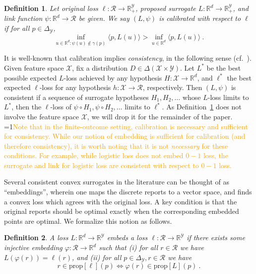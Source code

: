 \documentclass[12pt]{article}
\newcommand{\Comments}{1}
\newcommand{\mynote}[2]{\ifnum\Comments=1\textcolor{#1}{#2}\fi}
\newcommand{\proposedadd}[1]{\mynote{orange}{#1}}
\newcommand{\reals}{\mathbb{R}}
\newcommand{\prop}[1]{\mathrm{prop}[#1]}
\newcommand{\simplex}{\Delta_\Y}
\newcommand{\R}{\mathcal{R}}
\newcommand{\X}{\mathcal{X}}
\newcommand{\Y}{\mathcal{Y}}
\newcommand{\inprod}[2]{\langle #1, #2 \rangle}%
\DeclareMathOperator*{\argmin}{arg\,min}
\newtheorem{definition}{Definition}
\begin{document}
\begin{definition}
  \label{def:calibrated}
  Let original loss $\ell:\R\to\reals^\Y_+$, proposed surrogate $L:\reals^d\to\reals^\Y_+$, and link function $\psi:\reals^d\to\R$ be given.
  We say $(L,\psi)$ is \emph{calibrated} with respect to $\ell$ if
for all $p \in \simplex$,
  \begin{equation}
    \label{eq:calibrated}
  \inf_{u \in \reals^d : \psi(u) \not\in \gamma(p)} \inprod{p}{L(u)} > \inf_{u \in \reals^d} \inprod{p}{L(u)}~.
  \end{equation}
\end{definition}
It is well-known that calibration implies \emph{consistency}, in the following sense (cf.~\cite{agarwal2015consistent}).
Given feature space $\X$, fix a distribution $D \in \Delta(\X\times\Y)$.
Let $L^*$ be the best possible expected $L$-loss achieved by any hypothesis $H:\X\to\reals^d$, and $\ell^*$ the best expected $\ell$-loss for any hypothesis $h:\X\to\R$, respectively.
Then $(L,\psi)$ is consistent if a sequence of surrogate hypotheses $H_1,H_2,\ldots$ whose $L$-loss limits to $L^*$, then the $\ell$-loss of $\psi\circ H_1,\psi \circ H_2, \ldots$ limits to $\ell^*$.
As Definition~\ref{def:calibrated} does not involve the feature space $\X$, we will drop it for the remainder of the paper.
\proposedadd{Note that in the finite-outcome setting, calibration is necessary and sufficient for consistency.  While our notion of embedding is sufficient for calibration (and therefore consistency), it is worth noting that it is not \emph{necessary} for these conditions.  For example, while logistic loss does not embed $0-1$ loss, the surrogate and link for logistic loss are consistent with respect to $0-1$ loss.}

Several consistent convex surrogates in the literature can be thought of as ``embeddings'', wherein one maps the discrete reports to a vector space, and finds a convex loss which agrees with the original loss.
A key condition is that the original reports should be optimal exactly when the corresponding embedded points are optimal.
We formalize this notion as follows.
%
\begin{definition}\label{def:loss-embed}
  A loss $L:\reals^d\to\reals^\Y$ \emph{embeds} a loss $\ell:\R\to\reals^\Y$ if there exists some injective embedding $\varphi:\R\to\reals^d$ such that
  (i) for all $r\in\R$ we have $L(\varphi(r)) = \ell(r)$, and (ii) for all $p\in\simplex,r\in\R$ we have
  \begin{equation}\label{eq:embed-loss}
    r \in \prop{\ell}(p) \iff \varphi(r) \in \prop{L}(p)~.
  \end{equation}
\end{definition}
%
\end{document}
